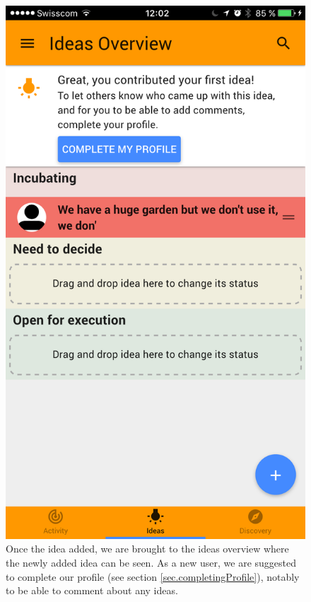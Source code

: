 \documentclass[a4paper,12pt,twoside]{article}
\begin{document}
\begin{figure}[!htb]
    \hfill
    \begin{minipage}[t]{.32\textwidth}
        \centering
        \includegraphics[width=\textwidth]{images/flow_addIdea_3.png}
        \caption{Once the idea added, we are brought to the ideas overview where the newly added idea can be seen. As a new user, we are suggested to complete our profile (see section \ref{sec.completingProfile}), notably to be able to comment about any ideas.}
    \end{minipage}
\end{figure}
\end{document}
